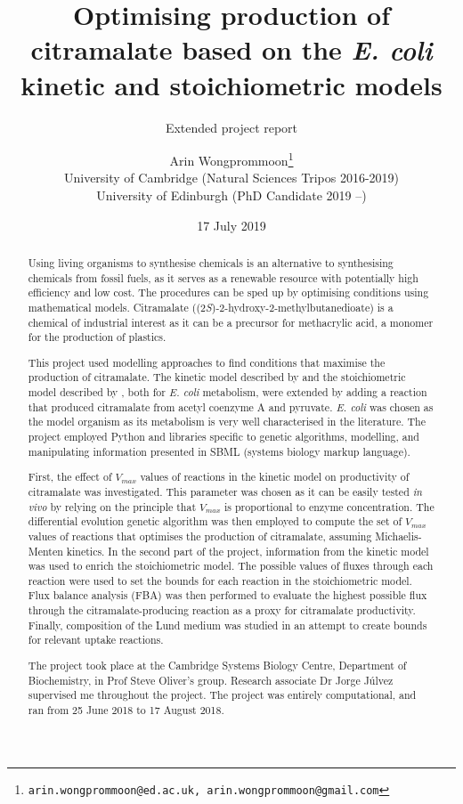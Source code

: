 \documentclass[parskip=full, numbers=noenddot]{scrreprt}
\author{Arin Wongprommoon\thanks{\texttt{arin.wongprommoon@ed.ac.uk, arin.wongprommoon@gmail.com}}
  \\University of Cambridge (Natural Sciences Tripos 2016-2019)
\\University of Edinburgh (PhD Candidate 2019 --)}
\title{Optimising production of citramalate based on the \emph{E. coli} kinetic and stoichiometric models}
\subtitle{Extended project report}
\date{17 July 2019}
\begin{document}
\maketitle

\tableofcontents

\begin{abstract}
  Using living organisms to synthesise chemicals is an alternative to synthesising chemicals from fossil fuels, as it serves as a renewable resource with potentially high efficiency and low cost. The procedures can be sped up by optimising conditions using mathematical models. Citramalate ((2\emph{S})-2-hydroxy-2-methylbutanedioate) is a chemical of industrial interest as it can be a precursor for methacrylic acid, a monomer for the production of plastics. 
  
  This project used modelling approaches to find conditions that maximise the production of citramalate. The kinetic model described by \citet{millard_metabolic_2017} and the stoichiometric model described by \citet{orth_comprehensive_2011}, both for \emph{E. coli} metabolism, were extended by adding a reaction that produced citramalate from acetyl coenzyme A and pyruvate. \emph{E. coli} was chosen as the model organism as its metabolism is very well characterised in the literature. The project employed Python and libraries specific to genetic algorithms, modelling, and manipulating information presented in SBML (systems biology markup language).
  
  First, the effect of $V_{max}$ values of reactions in the kinetic model on productivity of citramalate was investigated. This parameter was chosen as it can be easily tested \emph{in vivo} by relying on the principle that $V_{max}$ is proportional to enzyme concentration. The differential evolution genetic algorithm was then employed to compute the set of $V_{max}$ values of reactions that optimises the production of citramalate, assuming Michaelis-Menten kinetics. In the second part of the project, information from the kinetic model was used to enrich the stoichiometric model. The possible values of fluxes through each reaction were used to set the bounds for each reaction in the stoichiometric model. Flux balance analysis (FBA) was then performed to evaluate the highest possible flux through the citramalate-producing reaction as a proxy for citramalate productivity. Finally, composition of the Lund medium \citep{eastham_process_2015} was studied in an attempt to create bounds for relevant uptake reactions.
  
  The project took place at the Cambridge Systems Biology Centre, Department of Biochemistry, in Prof Steve Oliver's group. Research associate Dr Jorge J\'ulvez supervised me throughout the project. The project was entirely computational, and ran from 25 June 2018 to 17 August 2018.
\end{abstract}
\end{document}
